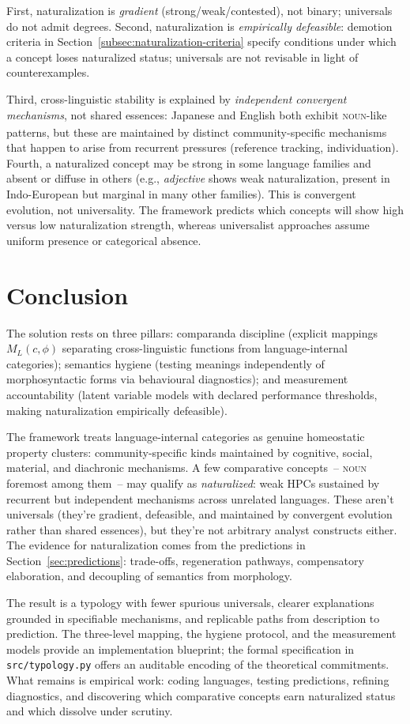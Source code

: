 \documentclass[12pt]{article}
\begin{document}
First, naturalization is \emph{gradient} (strong/weak/contested), not binary; universals do not admit degrees. Second, naturalization is \emph{empirically defeasible}: demotion criteria in Section~\ref{subsec:naturalization-criteria} specify conditions under which a concept loses naturalized status; universals are not revisable in light of counterexamples.

Third, cross-linguistic stability is explained by \emph{independent convergent mechanisms}, not shared essences: Japanese and English both exhibit \textsc{noun}\textsubscript{\Cross}-like patterns, but these are maintained by distinct community-specific mechanisms that happen to arise from recurrent pressures (reference tracking, individuation). Fourth, a naturalized concept may be strong in some language families and absent or diffuse in others (e.g., \textit{adjective} shows weak naturalization, present in Indo-European but marginal in many other families). This is convergent evolution, not universality. The framework predicts which concepts will show high versus low naturalization strength, whereas universalist approaches assume uniform presence or categorical absence.

\section{Conclusion}\label{sec:conclusion}
The solution rests on three pillars: comparanda discipline (explicit mappings $M_L(c,\phi)$ separating cross-linguistic functions from language-internal categories); semantics hygiene (testing meanings independently of morphosyntactic forms via behavioural diagnostics); and measurement accountability (latent variable models with declared performance thresholds, making naturalization empirically defeasible).

The framework treats language-internal categories as genuine homeostatic property clusters: community-specific kinds maintained by cognitive, social, material, and diachronic mechanisms. A few comparative concepts~-- \textsc{noun} foremost among them~-- may qualify as \emph{naturalized}: weak HPCs sustained by recurrent but independent mechanisms across unrelated languages. These aren't universals (they're gradient, defeasible, and maintained by convergent evolution rather than shared essences), but they're not arbitrary analyst constructs either. The evidence for naturalization comes from the predictions in Section~\ref{sec:predictions}: trade-offs, regeneration pathways, compensatory elaboration, and decoupling of semantics from morphology.

The result is a typology with fewer spurious universals, clearer explanations grounded in specifiable mechanisms, and replicable paths from description to prediction. The three-level mapping, the hygiene protocol, and the measurement models provide an implementation blueprint; the formal specification in \texttt{src/typology.py} offers an auditable encoding of the theoretical commitments. What remains is empirical work: coding languages, testing predictions, refining diagnostics, and discovering which comparative concepts earn naturalized status and which dissolve under scrutiny.

\clearpage
\printbibliography
\end{document}
